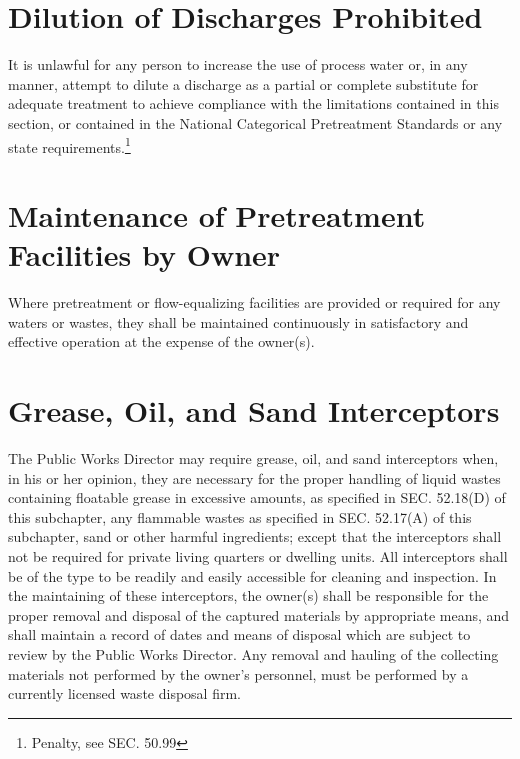 \section{Dilution of Discharges Prohibited}
It is unlawful for any person to increase the use of process water or, in any manner, attempt to dilute a discharge as a partial or complete substitute for adequate treatment to achieve compliance with the limitations contained in this section, or contained in the National Categorical Pretreatment Standards or any state requirements.\footnote{Penalty, see SEC. 50.99}

\section{Maintenance of Pretreatment Facilities by Owner}
Where pretreatment or flow-equalizing facilities are provided or required for any waters or wastes, they shall be maintained continuously in satisfactory and effective operation at the expense of the owner(s).

\section{Grease, Oil, and Sand Interceptors}
The Public Works Director may require grease, oil, and sand interceptors when, in his or her opinion, they are necessary for the proper handling of liquid wastes containing floatable grease in excessive amounts, as specified in SEC. 52.18(D) of this subchapter, any flammable wastes as specified in SEC. 52.17(A) of this subchapter, sand or other harmful ingredients; except that the interceptors shall not be required for private living quarters or dwelling units.  All interceptors shall be of the type to be readily and easily accessible for cleaning and inspection.  In the maintaining of these interceptors, the owner(s) shall be responsible for the proper removal and disposal of the captured materials by appropriate means, and shall maintain a record of dates and means of disposal which are subject to review by the Public Works Director.  Any removal and hauling of the collecting materials not performed by the owner’s personnel, must be performed by a currently licensed waste disposal firm.\\


